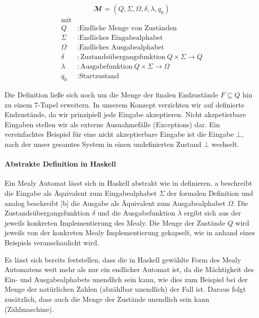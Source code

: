 \begin{definition}
\begin{align}
\mathbfcal{M} = \left( Q, \Sigma, \Omega, \delta, \lambda, q_0 \right)
\label{def:mealy-formal}
\end{align}
\begin{align*}
	\text{mit}\\
	Q &: \text{Endliche Menge von Zuständen} \\
	\Sigma  &:\text{Endliches Eingabealphabet} \\
	\Omega  &:\text{Endliches Ausgabealphabet} \\
	\delta  &:\text{Zustandsübergangsfunktion}\ Q \times \Sigma \rightarrow Q \\
	\lambda &:\text{Ausgabefunktion}\ Q \times \Sigma \rightarrow \Omega \\
	q_0 &: \text{Startzustand}
\end{align*}
\end{definition}

Die Definition ließe sich noch um die Menge der finalen Endzustände $F \subseteq Q$ hin zu einem 7-Tupel erweitern. In unserem Konzept verzichten wir auf definierte Endzustände, da wir prinzipiell jede Eingabe akzeptieren. Nicht akzpetierbare Eingaben stellen wir als externe Ausnahmefälle (Exceptions) dar. Ein vereinfachtes Beispiel für eine nicht akzeptierbare Eingabe ist die Eingabe $\bot$, nach der unser gesamtes System in einen undefinierten Zustand $\bot$ wechselt.

\paragraph{Abstrakte Definition in Haskell}
\label{sec:abstrakte-definition-haskell}

Ein Mealy Automat lässt sich in Haskell abstrakt wie in  definieren. {\ttfamily a} beschreibt die Eingabe als Äquivalent zum Eingabealphabet $\Sigma$ der formalen Definition und analog beschreibt |b| die Ausgabe als Äquivalent zum Ausgabealphabet $\Omega$. Die Zustandsübergangsfunktion $\delta$ und die Ausgabefunktion $\lambda$ ergibt sich aus der jeweils konkreten Implementierung des Mealy. Die Menge der Zustände $Q$ wird jeweils von der konkreten Mealy Implementierung gekapselt, wie in  anhand eines Beispiels veranschaulicht wird.

Es lässt sich bereits feststellen, dass die in Haskell gewählte Form des Mealy Automatens weit mehr als nur ein endlicher Automat ist, da die Mächtigkeit des Ein- und Ausgabealphabets unendlich sein kann, wie dies zum Beispiel bei der Menge der natürlichen Zahlen (abzählbar unendlich) der Fall ist. Daraus folgt zusätzlich, dass auch die Menge der Zustände unendlich sein kann (Zählmaschine).

